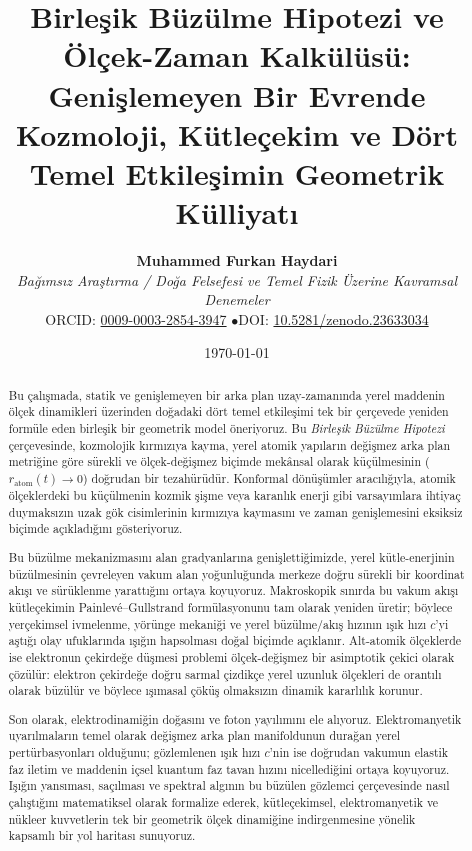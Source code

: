 \documentclass[11pt,a4paper]{article}
\title{\textbf{Birleşik Büzülme Hipotezi ve Ölçek-Zaman Kalkülüsü: \\ Genişlemeyen Bir Evrende Kozmoloji, Kütleçekim ve Dört Temel Etkileşimin Geometrik Külliyatı}}
\author{
    \textbf{Muhammed Furkan Haydari} \\
    \textit{Bağımsız Araştırma / Doğa Felsefesi ve Temel Fizik Üzerine Kavramsal Denemeler} \\
    \small ORCID: \href{https://orcid.org/0009-0003-2854-3947}{0009-0003-2854-3947} \quad$\bullet$\quad \small DOI: \href{https://doi.org/10.5281/zenodo.23633034}{10.5281/zenodo.23633034}
}
\date{\today}
\begin{document}
\shorthandoff{=}

\maketitle

\begin{abstract}
    Bu çalışmada, statik ve genişlemeyen bir arka plan uzay-zamanında yerel maddenin ölçek dinamikleri üzerinden doğadaki dört temel etkileşimi tek bir çerçevede yeniden formüle eden birleşik bir geometrik model öneriyoruz. Bu \textit{Birleşik Büzülme Hipotezi} çerçevesinde, kozmolojik kırmızıya kayma, yerel atomik yapıların değişmez arka plan metriğine göre sürekli ve ölçek-değişmez biçimde mekânsal olarak küçülmesinin ($r_{\mathrm{atom}}(t) \to 0$) doğrudan bir tezahürüdür. Konformal dönüşümler aracılığıyla, atomik ölçeklerdeki bu küçülmenin kozmik şişme veya karanlık enerji gibi varsayımlara ihtiyaç duymaksızın uzak gök cisimlerinin kırmızıya kaymasını ve zaman genişlemesini eksiksiz biçimde açıkladığını gösteriyoruz.

    Bu büzülme mekanizmasını alan gradyanlarına genişlettiğimizde, yerel kütle-enerjinin büzülmesinin çevreleyen vakum alan yoğunluğunda merkeze doğru sürekli bir koordinat akışı ve sürüklenme yarattığını ortaya koyuyoruz. Makroskopik sınırda bu vakum akışı kütleçekimin Painlev\'e--Gullstrand formülasyonunu tam olarak yeniden üretir; böylece yerçekimsel ivmelenme, yörünge mekaniği ve yerel büzülme/akış hızının ışık hızı $c$'yi aştığı olay ufuklarında ışığın hapsolması doğal biçimde açıklanır. Alt-atomik ölçeklerde ise elektronun çekirdeğe düşmesi problemi ölçek-değişmez bir asimptotik çekici olarak çözülür: elektron çekirdeğe doğru sarmal çizdikçe yerel uzunluk ölçekleri de orantılı olarak büzülür ve böylece ışımasal çöküş olmaksızın dinamik kararlılık korunur.

    Son olarak, elektrodinamiğin doğasını ve foton yayılımını ele alıyoruz. Elektromanyetik uyarılmaların temel olarak değişmez arka plan manifoldunun durağan yerel pertürbasyonları olduğunu; gözlemlenen ışık hızı $c$'nin ise doğrudan vakumun elastik faz iletim ve maddenin içsel kuantum faz tavan hızını nicellediğini ortaya koyuyoruz. Işığın yansıması, saçılması ve spektral algının bu büzülen gözlemci çerçevesinde nasıl çalıştığını matematiksel olarak formalize ederek, kütleçekimsel, elektromanyetik ve nükleer kuvvetlerin tek bir geometrik ölçek dinamiğine indirgenmesine yönelik kapsamlı bir yol haritası sunuyoruz.
\end{abstract}
\end{document}
